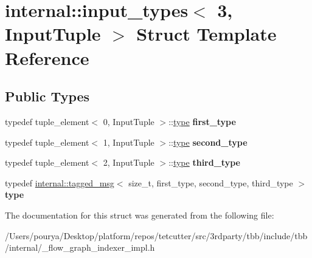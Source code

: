 \hypertarget{structinternal_1_1input__types_3_013_00_01InputTuple_01_4}{}\section{internal\+:\+:input\+\_\+types$<$ 3, Input\+Tuple $>$ Struct Template Reference}
\label{structinternal_1_1input__types_3_013_00_01InputTuple_01_4}
\subsection*{Public Types}
\begin{DoxyCompactItemize}
\item 
\hypertarget{structinternal_1_1input__types_3_013_00_01InputTuple_01_4_ac09caa02ab9348a43c840c9826c1dfc6}{}typedef tuple\+\_\+element$<$ 0, Input\+Tuple $>$\+::\hyperlink{classinternal_1_1tagged__msg}{type} {\bfseries first\+\_\+type}\label{structinternal_1_1input__types_3_013_00_01InputTuple_01_4_ac09caa02ab9348a43c840c9826c1dfc6}

\item 
\hypertarget{structinternal_1_1input__types_3_013_00_01InputTuple_01_4_aeb01a1f56b312507e1135205f5becd9f}{}typedef tuple\+\_\+element$<$ 1, Input\+Tuple $>$\+::\hyperlink{classinternal_1_1tagged__msg}{type} {\bfseries second\+\_\+type}\label{structinternal_1_1input__types_3_013_00_01InputTuple_01_4_aeb01a1f56b312507e1135205f5becd9f}

\item 
\hypertarget{structinternal_1_1input__types_3_013_00_01InputTuple_01_4_aadf6d755ee9a29e891f11eb9c1111667}{}typedef tuple\+\_\+element$<$ 2, Input\+Tuple $>$\+::\hyperlink{classinternal_1_1tagged__msg}{type} {\bfseries third\+\_\+type}\label{structinternal_1_1input__types_3_013_00_01InputTuple_01_4_aadf6d755ee9a29e891f11eb9c1111667}

\item 
\hypertarget{structinternal_1_1input__types_3_013_00_01InputTuple_01_4_af957cf4400c40174e3a8caa9a3dbea5d}{}typedef \hyperlink{classinternal_1_1tagged__msg}{internal\+::tagged\+\_\+msg}$<$ size\+\_\+t, first\+\_\+type, second\+\_\+type, third\+\_\+type $>$ {\bfseries type}\label{structinternal_1_1input__types_3_013_00_01InputTuple_01_4_af957cf4400c40174e3a8caa9a3dbea5d}

\end{DoxyCompactItemize}


The documentation for this struct was generated from the following file\+:\begin{DoxyCompactItemize}
\item 
/\+Users/pourya/\+Desktop/platform/repos/tetcutter/src/3rdparty/tbb/include/tbb/internal/\+\_\+flow\+\_\+graph\+\_\+indexer\+\_\+impl.\+h\end{DoxyCompactItemize}
